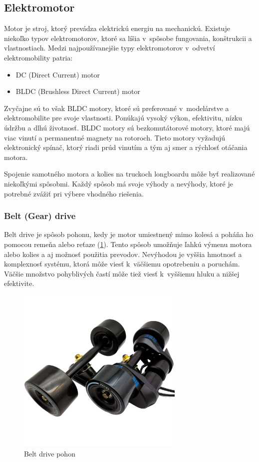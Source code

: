 \subsection{Elektromotor}
Motor je stroj, ktorý prevádza elektrickú energiu na mechanickú.
Existuje niekoľko typov elektromotorov, ktoré sa líšia v~spôsobe fungovania, konštrukcii a vlastnostiach.
Medzi najpoužívanejšie typy elektromotorov v~odvetví elektromobility patria:
\begin{itemize}
    \item {DC (Direct Current) motor}
    \item {BLDC (Brushless Direct Current) motor}
\end{itemize}
Zvyčajne sú to však BLDC motory, ktoré sú preferované v~modelárstve a elektromobilite pre svoje vlastnosti.
Ponúkajú vysoký výkon, efektivitu, nízku údržbu a dlhú životnosť.
BLDC motory sú bezkomutátorové motory, ktoré majú viac vinutí a permanentné magnety na rotoroch.
Tieto motory vyžadujú elektronický spínač, ktorý riadi prúd vinutím a tým aj smer a rýchlosť otáčania motora.\cite{Teja}

\bigskip

Spojenie samotného motora a kolies na truckoch longboardu môže byť realizované niekoľkými spôsobmi.
Každý spôsob má svoje výhody a nevýhody, ktoré je potrebné zvážiť pri výbere vhodného riešenia.

\newpage

\subsubsection{Belt (Gear) drive}
Belt drive je spôsob pohonu, kedy je motor umiestnený mimo kolesá a poháňa ho pomocou remeňa alebo reťaze (\ref{fig:belt-drive}).
Tento spôsob umožňuje ľahkú výmenu motora alebo kolies a aj možnosť použitia prevodov.
Nevýhodou je vyššia hmotnosť a komplexnosť systému, ktorá môže viesť k~väčšiemu opotrebeniu a poruchám.
Väčšie množstvo pohyblivých častí môže tiež viesť k~vyššiemu hluku a nižšej efektivite.\cite{WikiElectricSkateboard}

\begin{figure}[h]
    \centering
    \includegraphics[height=8cm, width=1\linewidth, keepaspectratio]{obrazky-figures/drive-belt.png}
    \caption{Belt drive pohon\cite{Puaida}}\label{fig:belt-drive}
\end{figure}

